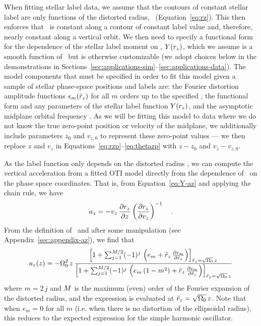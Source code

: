 When fitting stellar label data, we assume that the contours of constant stellar label
are only functions of the distorted radius, \rz\ (Equation~\ref{eq:rz}).
This then enforces that \rz\ is constant along a contour of constant label value and,
therefore, nearly constant along a vertical orbit.
We then need to specify a functional form for the dependence of the stellar label moment
on \rz, $Y(r_z)$, which we assume is a smooth function of \rz\ but is otherwise
customizable (we adopt choices below in the demonstrations in
Sections~\ref{sec:applications-sim}--\ref{sec:applications-data}).
The model components that must be specified in order to fit this model given a sample of
stellar phase-space positions and labels are: the Fourier distortion amplitude functions
$\epsilon_m(\tilde{r}_z)$ for all $m$ orders up to the specified \mmax, the functional form and
any parameters of the stellar label function $Y(r_z)$, and the asymptotic midplane
orbital frequency \freqzero.
As we will be fitting this model to data where we do not know the true zero-point
position or velocity of the midplane, we additionally include parameters $z_0$ and
$v_{z,0}$ to represent these zero-point values --- we then replace $z$ and $v_z$ in
Equations~\ref{eq:rzp}--\ref{eq:thetazp} with $z-z_0$ and $v_z - v_{z, 0}$.

As the label function only depends on the distorted radius \rz, we can compute the
vertical acceleration from a fitted OTI model directly from the dependence of \rz\ on
the phase space coordinates.
That is, from Equation~\ref{eq:Y-az} and applying the chain rule, we have
\begin{equation}
    a_z = - v_z \, \frac{\partial {r_z}}{\partial {z}} \left(\frac{\partial {r_z}}{\partial {v_z}}\right)^{-1} \quad .
\end{equation}
From the definition of \rz\ and after some manipulation (see
Appendix~\ref{sec:appendix-az}), we find that
\begin{equation}
    a_z(z) = - \Omega_0^2 \, z \,
    \frac{\left[
        1 + \sum_{j=1}^{M/2} (-1)^{j} \,
            \left(e_m + \tilde{r}_z \, \frac{\partial e_m}{\partial \tilde{r}_z}\right)
    \right]_{\tilde{r}_z = \sqrt{\Omega_0}\,z}}{\left[
        1 + \sum_{j=1}^{M/2} (-1)^{j} \,
            \left(e_m\,(1 - m^2) + \tilde{r}_z \, \frac{\partial e_m}{\partial \tilde{r}_z}\right)
    \right]_{\tilde{r}_z = \sqrt{\Omega_0}\,z}} \label{eq:az-ugly}
\end{equation}
where $m=2\,j$ and $M$ is the maximum (even) order of the Fourier expansion of the
distorted radius, and the expression is evaluated at $\tilde{r}_z = \sqrt{\Omega_0}\,z$.
Note that when $e_m = 0$ for all $m$ (i.e. when there is no distortion of the
ellipsoidal radius), this reduces to the expected expression for the simple harmonic
oscillator.

